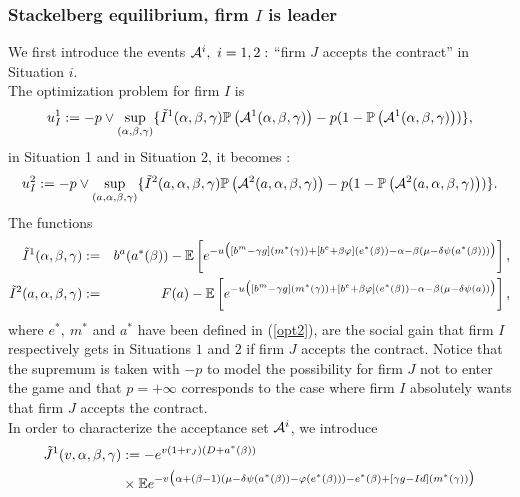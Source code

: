 \documentclass{svjour3}
\begin{document}
\subsubsection{Stackelberg equilibrium, firm $I$ is leader}\label{stackincominf}
We first introduce
the events ${\cal A}^i,~i=1,2:$  ``firm $J$ accepts the contract'' in Situation $i$.
\\
The optimization problem for firm $I$ is
\begin{equation}
\label{eqinfoincomplete1}
 u_I^1:=-p\vee\sup_{(\alpha,\beta,\gamma)}\{\tilde I^1(\alpha,\beta,\gamma){\mathbb{P}}\left({\cal A}^1(\alpha,\beta,\gamma)\right)-p(1-{\mathbb{P}}\left({\cal A}^1(\alpha,\beta,\gamma)\right))\},
 \end{equation}
in Situation 1 and in Situation 2, it becomes :
\begin{equation}
\label{eqinfoincomplete2}
 u_I^2:=-p\vee\sup_{(a,\alpha,\beta,\gamma)}\{\tilde I^2(a,\alpha,\beta,\gamma){\mathbb{P}}\left({\cal A}^2(a,\alpha,\beta,\gamma)\right)-p(1-{\mathbb{P}}\left({\cal A}^2(a,\alpha,\beta,\gamma)\right))\}.
 \end{equation}
 The functions 
\begin{eqnarray*}
  \hspace*{-0.5cm} 
  \tilde I^1(\alpha,\beta,\gamma)&:=&
b^a (a^*(\beta))
- \mathbb{E}\left[ 
e^{-u\big([b^m-\gamma g](m^*(\gamma))+[b^e+\beta\varphi](e^*(\beta))
-\alpha-\beta(\mu-\delta \psi(a^*(\beta)))\big)}\right ],
\\
\tilde I^2(a,\alpha,\beta,\gamma)&:=&F(a)-
\mathbb{E}\left[e^{-u\big([b^m-\gamma g](m^*(\gamma))+[b^e+\beta\varphi](e^*(\beta))-\alpha-\beta(\mu-\delta \psi(a))\big)}\right],
\end{eqnarray*}
where $e^*,~m^*$ and $a^*$ have been defined in (\ref{opt2}),
are the social gain that firm $I$ respectively gets in Situations $1$ and $2$ if firm $J$ accepts the contract. Notice that the supremum is taken with $-p$ to model the possibility for firm $J$ not to enter the game and that $p=+\infty$ corresponds to the case where firm $I$ absolutely wants that firm $J$ accepts the contract.
\\
In order to characterize the acceptance set ${\cal A}^i$, we introduce
\begin{align}
\tilde J^1(v,\alpha,\beta,\gamma)&:=-e^{v(1+r_J)(D+ a^*(\beta))}\notag\\&\times{\mathbb{E}} e^{-v\big(\alpha+(\beta-1)(\mu-\delta\psi(a^*(\beta))-\varphi(e^*(\beta)))-e^*(\beta)+[\gamma g-Id](m^*(\gamma)) \big)}  
\label{deftJv1}
 \end{align}
\end{document}
